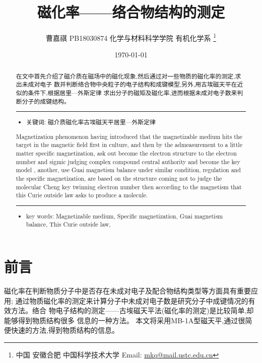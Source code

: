 \documentclass[11pt]{report}
\author{曹嘉祺 PB18030874 化学与材料科学学院 有机化学系 \thanks{中国 安徽合肥 中国科学技术大学 Email: \href{mailto:mkq@mail.ustc.edu.cn}{mkq@mail.ustc.edu.cn}}}
\date{\today}
\title{磁化率——络合物结构的测定}
\begin{document}
\maketitle
\tableofcontents

\begin{abstract}
在文中首先介绍了磁介质在磁场中的磁化现象,然后通过对一些物质的磁化率的测定,求出未成对电子
数并判断络合物中央粒子的电子结构和成键模型,另外,用古埃磁天平在近似的条件下,根据居里—外斯定律
求出分子的磁矩及磁化率,进而根据未成对电子数来判断分子的成键结构。

\noindent\rule{\textwidth}{0.5pt}
\begin{itemize}
\item 关键词: 磁介质\quad 磁化率\quad 古埃磁天平\quad 居里—外斯定律
\end{itemize}
\end{abstract}




\begin{abstract}
Magnetization phenomenon having introduced that the magnetizable medium hits the
target in the magnetic field first in culture, and then by the admeasurement to a little matter
specific magnetization, ask out become the electron structure to the electron number and sigmic
judging complex compound central authority and become the key model , another, use Guai
magnetism balance under similar condition, regulation and the specific magnetization, are based
on the structure coming not to judge the molecular Cheng key twinning electron number then
according to the magnetism that this Curie outside law asks to produce a molecule.

\noindent\rule{\textwidth}{0.5pt}

\begin{itemize}
\item key words:  Magnetizable medium, Specific magnetization, Guai magnetism balance, This Curie outside law,
\end{itemize}
\end{abstract}
\part{前言}
\label{sec:orgf3f1ade}
磁化率在判断物质分子中是否存在未成对电子及配合物结构类型等方面具有重要应用;
通过物质磁化率的测定来计算分子中未成对电子数是研究分子中成键情况的有效方法。络合
物电子结构的测定——古埃磁天平法(磁化率的测定)是比较简单,却能够得到物质结构很多
信息的一种方法。
本文将采用MB-1A型磁天平,通过很简便快速的方法,得到物质结构的信息。
\end{document}
